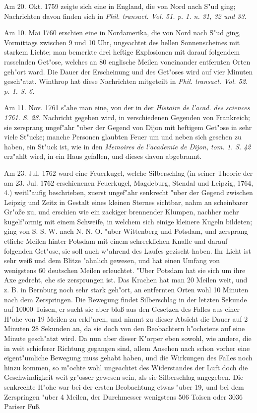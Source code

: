 \documentclass[a4paper, 11pt, oneside, polutonikogreek, german]{article}
\begin{document}
Am 20. Okt. 1759 zeigte sich eine in England, die von Nord nach S"ud ging; Nachrichten davon finden sich in \emph{Phil. transact. Vol. 51. p. 1. n. 31, 32 und 33}.

Am 10. Mai 1760 erschien eine in Nordamerika, die von Nord nach S"ud ging, Vormittags zwischen 9 und 10 Uhr, ungeachtet des hellen Sonnenscheines mit starkem Lichte; man bemerkte drei heftige Explosionen mit darauf folgendem rasselnden Get"ose, welches an 80 englische Meilen voneinander entfernten Orten geh"ort ward. Die Dauer der Erscheinung und des Get"oses wird auf vier Minuten gesch"atzt. Winthrop hat diese Nachrichten mitgeteilt in \emph{Phil. transact. Vol. 52. p. 1. S. 6.}

Am 11. Nov. 1761 s"ahe man eine, von der in der \emph{Histoire de l'acad. des sciences 1761. S. 28.} Nachricht gegeben wird, in verschiedenen Gegenden von Frankreich; sie zersprang ungef"ahr "uber der Gegend von Dijon mit heftigem Get"ose in sehr viele St"ucke; manche Personen glaubten Feuer um und neben sich gesehen zu haben, ein St"uck ist, wie in den \emph{Memoires de l'academie de Dijon, tom. 1. S. 42} erz"ahlt wird, in ein Haus gefallen, und dieses davon abgebrannt.

Am 23. Jul. 1762 ward eine Feuerkugel, welche Silberschlag (in seiner Theorie der am 23. Jul. 1762 erschienenen Feuerkugel, Magdeburg, Stendal und Leipzig, 1764, 4.) weitl"aufig beschrieben, zuerst ungef"ahr senkrecht "uber der Gegend zwischen Leipzig und Zeitz in Gestalt eines kleinen Sternes sichtbar, nahm an scheinbarer Gr"oße zu, und erschien wie ein zackiger brennender Klumpen, nachher mehr kugelf"ormig mit einem Schweife, in welchem sich einige kleinere Kugeln bildeten; ging von S. S. W. nach N. N. O. "uber Wittenberg und Potsdam, und zersprang etliche Meilen hinter Potsdam mit einem schrecklichen Knalle und darauf folgenden Get"ose, sie soll auch w"ahrend des Laufes gezischt haben. Ihr Licht ist sehr weiß und dem Blitze "ahnlich gewesen, und hat einen Umfang von wenigstens 60 deutschen Meilen erleuchtet. "Uber Potsdam hat sie sich um ihre Axe gedreht, ehe sie zersprungen ist. Das Krachen hat man 20 Meilen weit, und z. B. in Bernburg noch sehr stark geh"ort, an entfernten Orten wohl 10 Minuten nach dem Zerspringen. Die Bewegung findet Silberschlag in der letzten Sekunde auf 10000 Toisen, er sucht sie aber bloß aus den Gesetzen des Falles aus einer H"ohe von 19 Meilen zu erkl"aren, und nimmt zu dieser Absicht die Dauer auf 2 Minuten 28 Sekunden an, da sie doch von den Beobachtern h"ochstens auf eine Minute gesch"atzt wird. Da nun aber dieser K"orper eben sowohl, wie andere, die in weit schieferer Richtung gegangen sind, allem Ansehen nach schon vorher eine eigent"umliche Bewegung muss gehabt haben, und die Wirkungen des Falles noch hinzu kommen, so m"ochte wohl ungeachtet des Widerstandes der Luft doch die Geschwindigkeit weit gr"osser gewesen sein, als sie Silberschlag angegeben. Die senkrechte H"ohe war bei der ersten Beobachtung etwas "uber 19, und bei dem Zerspringen "uber 4 Meilen, der Durchmesser wenigstens 506 Toisen oder 3036 Pariser Fuß.
\end{document}
